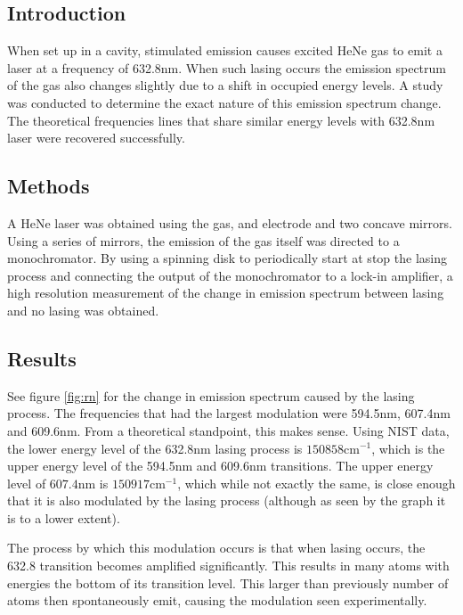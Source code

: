 \documentclass[letterpaper, reqno,11pt]{article}
\begin{document}
\subsection{Introduction}

When set up in a cavity, stimulated emission causes excited HeNe gas to emit a laser at a frequency of 632.8nm. When such lasing occurs the emission spectrum of the gas also changes slightly due to a shift in occupied energy levels. A study was conducted to determine the exact nature of this emission spectrum change. The theoretical frequencies lines that share similar energy levels with 632.8nm laser were recovered successfully.

\subsection{Methods}

A HeNe laser was obtained using the gas, and electrode and two concave mirrors. Using a series of mirrors, the emission of the gas itself was directed to a monochromator. By using a spinning disk to periodically start at stop the lasing process and connecting the output of the monochromator to a lock-in amplifier, a high resolution measurement of the change in emission spectrum between lasing and no lasing was obtained.

\subsection{Results}

See figure \ref{fig:rn} for the change in emission spectrum caused by the lasing process. The frequencies that had the largest modulation were 594.5nm, 607.4nm and 609.6nm. From a theoretical standpoint, this makes sense. Using NIST data, the lower energy level of the 632.8nm lasing process is $150858\text{cm}^{-1}$, which is the upper energy level of the 594.5nm and 609.6nm transitions. The upper energy level of $607.4$nm is $150917\text{cm}^{-1}$, which while not exactly the same, is close enough that it is also modulated by the lasing process (although as seen by the graph it is to a lower extent).

The process by which this modulation occurs is that when lasing occurs, the 632.8 transition becomes amplified significantly. This results in many atoms with energies the bottom of its transition level. This larger than previously number of atoms then spontaneously emit, causing the modulation seen experimentally.
\end{document}
